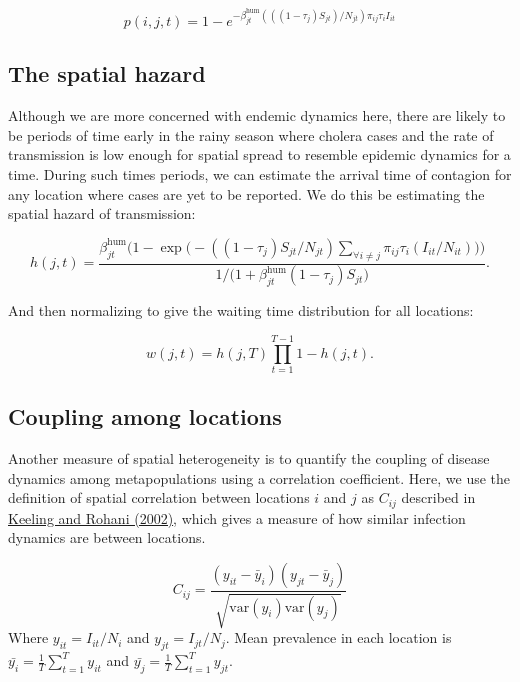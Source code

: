 \documentclass[
]{book}
\begin{document}
\begin{equation} 
p(i,j,t) = 1 - e^{-\beta_{jt}^{\text{hum}} (((1-\tau_j)S_{jt})/N_{jt}) \pi_{ij}\tau_iI_{it}}
\label{eq:prob}
\end{equation}

\subsection{The spatial hazard}\label{the-spatial-hazard}

Although we are more concerned with endemic dynamics here, there are likely to be periods of time early in the rainy season where cholera cases and the rate of transmission is low enough for spatial spread to resemble epidemic dynamics for a time. During such times periods, we can estimate the arrival time of contagion for any location where cases are yet to be reported. We do this be estimating the spatial hazard of transmission:

\begin{equation} 
h(j,t) = \frac{
\beta_{jt}^{\text{hum}} \Big(1 - \exp\big(-((1-\tau_j)S_{jt}/N_{jt}) \sum_{\forall i \not= j} \pi_{ij}\tau_i (I_{it}/N_{it}) \big) \Big)
}{
1/\big(1 + \beta_{jt}^{\text{hum}} (1-\tau_j)S_{jt}\big)
}.
\label{eq:hazard}
\end{equation}

And then normalizing to give the waiting time distribution for all locations:

\begin{equation} 
w(j,t) = h(j,T) \prod_{t=1}^{T-1}1-h(j,t).
\label{eq:waiting}
\end{equation}

\subsection{Coupling among locations}\label{coupling-among-locations}

Another measure of spatial heterogeneity is to quantify the coupling of disease dynamics among metapopulations using a correlation coefficient. Here, we use the definition of spatial correlation between locations \(i\) and \(j\) as \(C_{ij}\) described in \href{https://onlinelibrary.wiley.com/doi/abs/10.1046/j.1461-0248.2002.00268.x}{Keeling and Rohani (2002)}, which gives a measure of how similar infection dynamics are between locations.

\begin{equation} 
C_{ij} = \frac{
( y_{it} - \bar{y}_i )( y_{jt} - \bar{y}_j )
}{
\sqrt{\text{var}(y_i) \text{var}(y_j)}
}
\label{eq:correlation}
\end{equation}
Where \(y_{it} = I_{it}/N_i\) and \(y_{jt} = I_{jt}/N_j\). Mean prevalence in each location is \(\bar{y_i} = \frac{1}{T} \sum_{t=1}^{T} y_{it}\) and \(\bar{y_j} = \frac{1}{T} \sum_{t=1}^{T} y_{jt}\).
\end{document}
